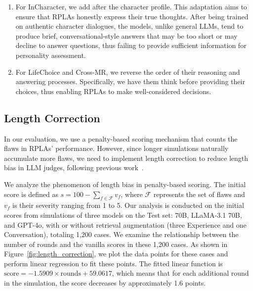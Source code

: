 \begin{enumerate}
    \item For InCharacter, we add  after the character profile. 
    This adaptation aims to ensure that RPLAs honestly express their true thoughts. After being trained on authentic character dialogues, the \method models, unlike general LLMs, tend to produce brief, conversational-style answers that may be too short or may decline to answer questions, thus failing to provide sufficient information for  personality assessment.
    \item For LifeChoice and Cross-MR, we reverse the order of their reasoning and answering processes. Specifically, we have them think before providing their choices, thus enabling RPLAs to make well-considered decisions. 
\end{enumerate}

\subsection{Length Correction}
\label{sec:length_correction}

In our evaluation, we use a penalty-based scoring mechanism that counts the flaws in RPLAs' performance. 
However, since longer simulations naturally accumulate more flaws, we need to implement length correction to reduce length bias in LLM judges, following previous work~\citep{li2024judgesurvey}. 

We analyze the phenomenon of length bias in penalty-based scoring. 
The initial score is defined as \( s = 100-\sum_{f\in\mathcal{F}}v_f \), where \( \mathcal{F} \) represents the set of flaws and \( v_f \) is their severity ranging from 1 to 5. 
Our analysis is conducted on the initial scores from simulations of three models on the \method Test set: \method 70B, LLaMA-3.1 70B, and GPT-4o, with or without retrieval augmentation (three Experience and one Conversation), totaling 1,200 cases. 
We examine the relationship between the number of rounds and the vanilla scores in these 1,200 cases. 
As shown in Figure~\ref{fig:length_correction}, we plot the data points for these cases and perform linear regression to fit these points. 
The fitted linear function is \( \text{score} = -1.5909 \times \text{rounds} + 59.0617 \), which means that for each additional round in the simulation, the score decreases by approximately 1.6 points. 

